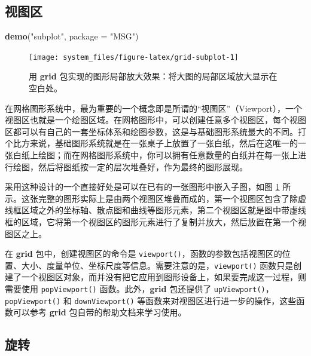 \documentclass[
  b5paper,
  UTF8,twoside]{book}
\newenvironment{Shaded}{\begin{snugshade}}{\end{snugshade}}
\newcommand{\AttributeTok}[1]{\textcolor[rgb]{0.13,0.29,0.53}{#1}}
\newcommand{\FunctionTok}[1]{\textcolor[rgb]{0.13,0.29,0.53}{\textbf{#1}}}
\newcommand{\NormalTok}[1]{#1}
\newcommand{\StringTok}[1]{\textcolor[rgb]{0.31,0.60,0.02}{#1}}
\begin{document}
\subsection{视图区}\label{ux89c6ux56feux533a}

\begin{Shaded}
\begin{Highlighting}[]
\FunctionTok{demo}\NormalTok{(}\StringTok{"subplot"}\NormalTok{, }\AttributeTok{package =} \StringTok{"MSG"}\NormalTok{)}
\end{Highlighting}
\end{Shaded}

\begin{figure}

{\centering \texttt{[image: system\_files/figure-latex/grid-subplot-1]} 

}

\caption[用 \textbf{grid} 包实现的图形局部放大效果]{用 \textbf{grid} 包实现的图形局部放大效果：将大图的局部区域放大显示在空白处。}\label{fig:grid-subplot}
\end{figure}





在网格图形系统中，最为重要的一个概念即是所谓的``视图区''（Viewport），一个视图区也就是一个绘图区域。在网格图形中，可以创建任意多个视图区，每个视图区都可以有自己的一套坐标体系和绘图参数，这是与基础图形系统最大的不同。打个比方来说，基础图形系统就是在一张桌子上放置了一张白纸，然后在这唯一的一张白纸上绘图；而在网格图形系统中，你可以拥有任意数量的白纸并在每一张上进行绘图，然后将图纸按一定的层次堆叠好，作为最终的图形展现。

采用这种设计的一个直接好处是可以在已有的一张图形中嵌入子图，如图 \ref{fig:grid-subplot} 所示。这张完整的图形实际上是由两个视图区堆叠而成的，第一个视图区包含了除虚线框区域之外的坐标轴、散点图和曲线等图形元素，第二个视图区就是图中带虚线框的区域，它将第一个视图区的图形元素进行了复制并放大，然后放置在第一个视图区之上。

在 \textbf{grid} 包中，创建视图区的命令是 \texttt{viewport()}，函数的参数包括视图区的位置、大小、度量单位、坐标尺度等信息。需要注意的是，\texttt{viewport()} 函数只是创建了一个视图区对象，而并没有把它应用到图形设备上，如果要完成这一过程，则需要使用 \texttt{popViewport()} 函数。此外，\textbf{grid} 包还提供了 \texttt{upViewport()}，\texttt{popViewport()} 和 \texttt{downViewport()} 等函数来对视图区进行进一步的操作，这些函数可以参考 \textbf{grid} 包自带的帮助文档来学习使用。

\subsection{旋转}\label{ux65cbux8f6c}
\end{document}
